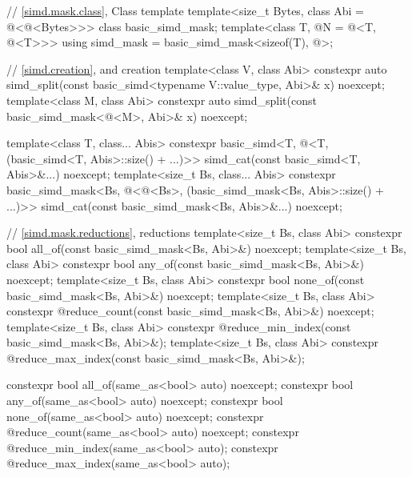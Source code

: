 \begin{codeblock}
{  // \ref{simd.mask.class}, Class template 
  template<size_t Bytes, class Abi = @\nativeabi@<@\integerfrom@<Bytes>>> class basic_simd_mask;
  template<class T, @\simdsizetype@ N = @\simdsizev@<T, @\nativeabi@<T>>>
    using simd_mask = basic_simd_mask<sizeof(T), @>;

  // \ref{simd.creation},  and  creation
  template<class V, class Abi>
    constexpr auto
      simd_split(const basic_simd<typename V::value_type, Abi>& x) noexcept;
  template<class M, class Abi>
    constexpr auto
      simd_split(const basic_simd_mask<@\maskelementsize@<M>, Abi>& x) noexcept;

  template<class T, class... Abis>
    constexpr basic_simd<T, @\deducet@<T, (basic_simd<T, Abis>::size() + ...)>>
      simd_cat(const basic_simd<T, Abis>&...) noexcept;
  template<size_t Bs, class... Abis>
    constexpr basic_simd_mask<Bs, @\deducet@<@\integerfrom@<Bs>,
                              (basic_simd_mask<Bs, Abis>::size() + ...)>>
      simd_cat(const basic_simd_mask<Bs, Abis>&...) noexcept;

  // \ref{simd.mask.reductions},  reductions
  template<size_t Bs, class Abi>
    constexpr bool all_of(const basic_simd_mask<Bs, Abi>&) noexcept;
  template<size_t Bs, class Abi>
    constexpr bool any_of(const basic_simd_mask<Bs, Abi>&) noexcept;
  template<size_t Bs, class Abi>
    constexpr bool none_of(const basic_simd_mask<Bs, Abi>&) noexcept;
  template<size_t Bs, class Abi>
    constexpr @\simdsizetype@ reduce_count(const basic_simd_mask<Bs, Abi>&) noexcept;
  template<size_t Bs, class Abi>
    constexpr @\simdsizetype@ reduce_min_index(const basic_simd_mask<Bs, Abi>&);
  template<size_t Bs, class Abi>
    constexpr @\simdsizetype@ reduce_max_index(const basic_simd_mask<Bs, Abi>&);

  constexpr bool all_of(same_as<bool> auto) noexcept;
  constexpr bool any_of(same_as<bool> auto) noexcept;
  constexpr bool none_of(same_as<bool> auto) noexcept;
  constexpr @\simdsizetype@ reduce_count(same_as<bool> auto) noexcept;
  constexpr @\simdsizetype@ reduce_min_index(same_as<bool> auto);
  constexpr @\simdsizetype@ reduce_max_index(same_as<bool> auto);

}
\end{codeblock}

